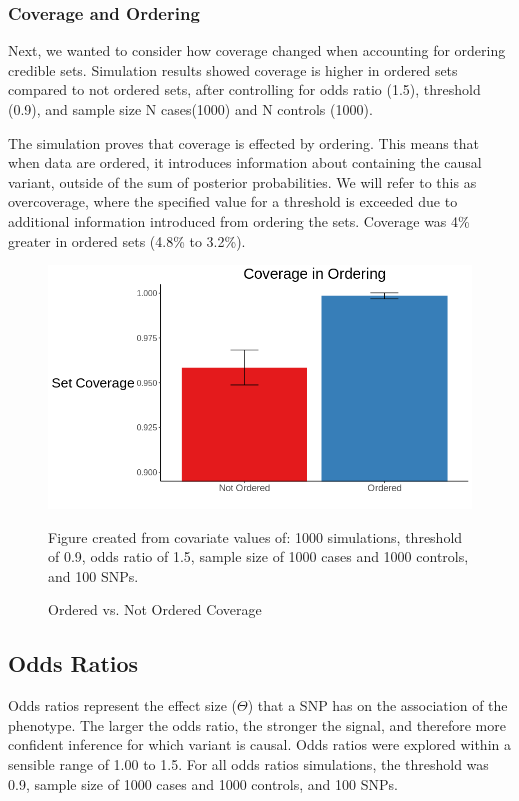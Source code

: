 \subsubsection{Coverage and Ordering}
Next, we wanted to consider how coverage changed when accounting for ordering credible sets. Simulation results showed coverage is higher in ordered sets compared to not ordered sets, after controlling for odds ratio (1.5), threshold (0.9), and sample size N cases(1000) and N controls (1000). 

The simulation proves that coverage is effected by ordering. This means that when data are ordered, it introduces information about containing the causal variant, outside of the sum of posterior probabilities. We will refer to this as overcoverage, where the specified value for a threshold is exceeded due to additional information introduced from ordering the sets. Coverage was 4\% greater in ordered sets (4.8\% to 3.2\%). 

\begin{figure}[H]
\centering
\includegraphics[scale=0.625]{images/Barplots/Ordered_Cov.png}
\caption{Ordered vs. Not Ordered Coverage}
    \smallskip
    \footnotesize
Figure created from covariate values of: 1000 simulations, threshold of 0.9, odds ratio of 1.5, sample size of 1000 cases and 1000 controls, and 100 SNPs. 
\label{fig: Ordered_Cov}
\end{figure}

\subsection{Odds Ratios}

Odds ratios represent the effect size ($\Theta$) that a SNP has on the association of the phenotype. The larger the odds ratio, the stronger the signal, and therefore more confident inference for which variant is causal. Odds ratios were explored within a sensible range of 1.00 to 1.5. For all odds ratios simulations, the threshold was 0.9, sample size of 1000 cases and 1000 controls, and 100 SNPs. 


